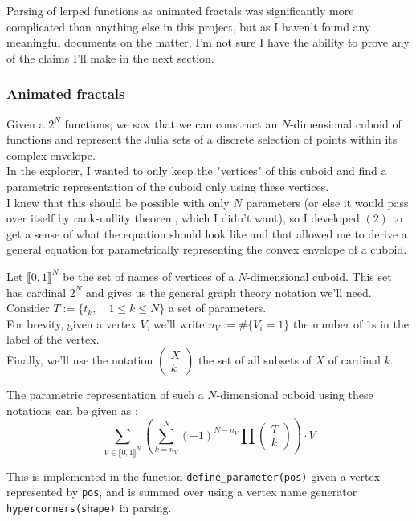 \documentclass{article}
\begin{document}
Parsing of lerped functions as animated fractals was significantly more complicated than anything else in this project, but as I haven't found any meaningful documents on the matter, I'm not sure I have the ability to prove any of the claims I'll make in the next section. \\
\vspace{5mm}

\subsubsection{Animated fractals}

Given a $2^N$ functions, we saw that we can construct an $N$-dimensional cuboid of functions and represent the Julia sets of a discrete selection of points within its complex envelope. \\
\vspace{2mm}
In the explorer, I wanted to only keep the "vertices" of this cuboid and find a parametric representation of the cuboid only using these vertices. \\
I knew that this should be possible with only $N$ parameters (or else it would pass over itself by rank-nullity theorem, which I didn't want), so I developed $(2)$ to get a sense of what the equation should look like and that allowed me to derive a general equation for parametrically representing the convex envelope of a cuboid. \\
\vspace{5mm}

Let $\llbracket 0,1 \rrbracket^N$ be the set of names of vertices of a $N$-dimensional cuboid. This set has cardinal $2^N$ and gives us the general graph theory notation we'll need. \\
\vspace{2mm}
Consider $T := \lbrace t_k, \quad 1 \leq k \leq N \rbrace$ a set of parameters. \\
\vspace{2mm}
For brevity, given a vertex $V$, we'll write $n_V := \# \lbrace V_i = 1 \rbrace$ the number of $1$s in the label of the vertex. \\
\vspace{2mm}
Finally, we'll use the notation $\begin{pmatrix}
X \\ k
\end{pmatrix}$ the set of all subsets of $X$ of cardinal $k$. \\
\vspace{5mm}

The parametric representation of such a $N$-dimensional cuboid using these notations can be given as : \\
$$\sum_{V \in \llbracket 0, 1 \rrbracket^N}{\left( \sum_{k=n_V}^N{(-1)^{N-n_V} \prod{\begin{pmatrix} T \\ k \end{pmatrix}}} \right) \cdot V}$$


This is implemented in the function \texttt{define\_parameter(pos)} given a vertex represented by \texttt{pos}, and is summed over using a vertex name generator \texttt{hypercorners(shape)} in parsing.




\end{document}
